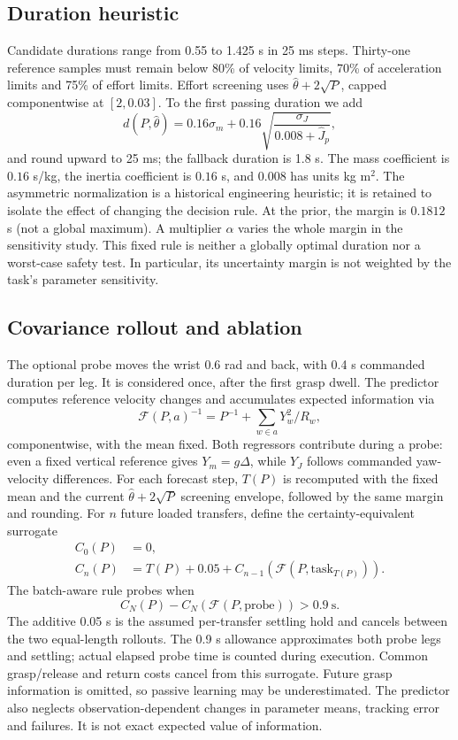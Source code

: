 \documentclass[10pt,twocolumn]{article}
\begin{document}
\subsection{Duration heuristic}
Candidate durations range from 0.55 to 1.425 s in 25 ms steps. Thirty-one reference samples must remain below 80\% of velocity limits, 70\% of acceleration limits and 75\% of effort limits. Effort screening uses $\hat\theta+2\sqrt{P}$, capped componentwise at $[2,0.03]$. To the first passing duration we add
\begin{equation}
 d(P,\hat\theta)=0.16\sigma_m+
 0.16\sqrt{\frac{\sigma_J}{0.008+\hat J_p}},
\end{equation}
and round upward to 25 ms; the fallback duration is 1.8 s. The mass coefficient is $0.16$ s/kg, the inertia coefficient is $0.16$ s, and $0.008$ has units kg m$^2$. The asymmetric normalization is a historical engineering heuristic; it is retained to isolate the effect of changing the decision rule. At the prior, the margin is $0.1812$ s (not a global maximum). A multiplier $\alpha$ varies the whole margin in the sensitivity study. This fixed rule is neither a globally optimal duration nor a worst-case safety test. In particular, its uncertainty margin is not weighted by the task's parameter sensitivity.

\subsection{Covariance rollout and ablation}
The optional probe moves the wrist 0.6 rad and back, with 0.4 s commanded duration per leg. It is considered once, after the first grasp dwell. The predictor computes reference velocity changes and accumulates expected information via
\begin{equation}
 \mathcal F(P,a)^{-1}=P^{-1}+\sum_{w\in a}Y_w^2/R_w,
\end{equation}
componentwise, with the mean fixed. Both regressors contribute during a probe: even a fixed vertical reference gives $Y_m=g\Delta$, while $Y_J$ follows commanded yaw-velocity differences. For each forecast step, $T(P)$ is recomputed with the fixed mean and the current $\hat\theta+2\sqrt P$ screening envelope, followed by the same margin and rounding. For $n$ future loaded transfers, define the certainty-equivalent surrogate
\begin{align}
 C_0(P)&=0,\\
 C_n(P)&=T(P)+0.05+C_{n-1}(\mathcal F(P,\mathrm{task}_{T(P)})).
\end{align}
The batch-aware rule probes when
\begin{equation}
 C_N(P)-C_N(\mathcal F(P,\mathrm{probe}))>0.9\ \mathrm{s}.
\end{equation}
The additive 0.05 s is the assumed per-transfer settling hold and cancels between the two equal-length rollouts. The 0.9 s allowance approximates both probe legs and settling; actual elapsed probe time is counted during execution. Common grasp/release and return costs cancel from this surrogate. Future grasp information is omitted, so passive learning may be underestimated. The predictor also neglects observation-dependent changes in parameter means, tracking error and failures. It is not exact expected value of information.
\end{document}
